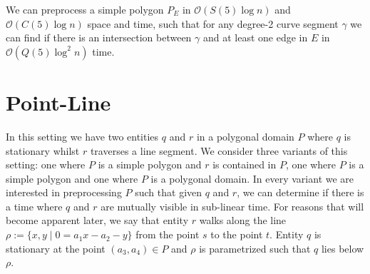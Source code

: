\documentclass[a4paper, UKenglish]{lipics-v2018}
\begin{document}
\begin{theorem}
    We can preprocess a simple polygon $P_E$ in $\mathcal{O}(S(5) \log n)$ and $\mathcal{O}(C(5) \log n)$ space and time, such that for any degree-2 curve segment $\gamma$ we can find if there is an intersection between $\gamma$ and at least one edge in $E$ in $\mathcal{O}( Q(5) \log^2 n)$ time. 
\end{theorem}

\section{Point-Line}
\label{sec:pointline}


In this setting we have two entities $q$ and $r$ in a polygonal domain $P$ where $q$ is stationary whilst $r$ traverses a line segment. We consider three variants of this setting: one where $P$ is a simple polygon and $r$ is contained in $P$, one where $P$ is a simple polygon and one where $P$ is a polygonal domain. In every variant we are interested in preprocessing $P$ such that given $q$ and $r$, we can determine if there is a time where $q$ and $r$ are mutually visible in sub-linear time. For reasons that will become apparent later, we say that entity $r$ walks along the line $\rho := \{ x,y \mid  0 = a_1 x - a_2 - y \}$ from the point $s$ to the point $t$. Entity $q$ is stationary at the point $(a_3, a_4) \in P$ and $\rho$ is parametrized such that $q$ lies below $\rho$.
\end{document}
